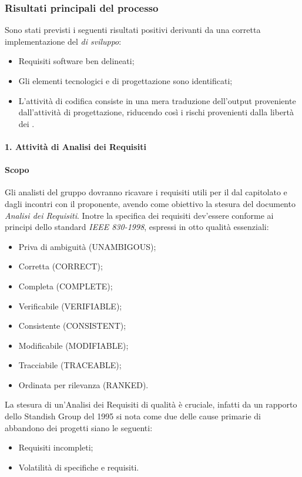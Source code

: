         \subsubsection{Risultati principali del processo}
        Sono stati previsti i seguenti risultati positivi derivanti da una corretta implementazione del \textit{ di sviluppo}:
        \begin{itemize}
          \item Requisiti software ben delineati;
          \item Gli elementi tecnologici e di progettazione sono identificati;
          \item L'attivit\`a di codifica consiste in una mera traduzione dell'output proveniente dall'attivit\`a di progettazione,
            riducendo cos\`i i rischi provenienti dalla libert\`a dei .
        \end{itemize}
        
		\paragraph*{1. Attività di Analisi dei Requisiti}
			\paragraph*{Scopo}
				Gli analisti del gruppo dovranno ricavare i requisiti utili per il 
				dal capitolato e dagli incontri con il proponente, avendo come obiettivo la
				stesura del documento \textit{Analisi dei Requisiti}.
			        Inotre la specifica dei requisiti dev'essere conforme ai principi dello standard \textit{IEEE 830-1998}, espressi in otto qualit\`a
			        essenziali:
				\begin{itemize}
				\item Priva di ambiguit\`a (UNAMBIGOUS);
				\item Corretta (CORRECT);
				\item Completa (COMPLETE);
				\item Verificabile (VERIFIABLE);
				\item Consistente (CONSISTENT);
				\item Modificabile (MODIFIABLE);
				\item Tracciabile (TRACEABLE);
				\item Ordinata per rilevanza (RANKED).
				\end{itemize}
			        La stesura di un'Analisi dei Requisiti di qualit\`a \`e cruciale, infatti
			        da un rapporto dello Standish Group del 1995 si nota come due delle cause primarie
			        di abbandono dei progetti siano le seguenti:
				\begin{itemize}
				\item Requisiti incompleti;
				\item Volatilità di specifiche e requisiti.
				\end{itemize}
			

